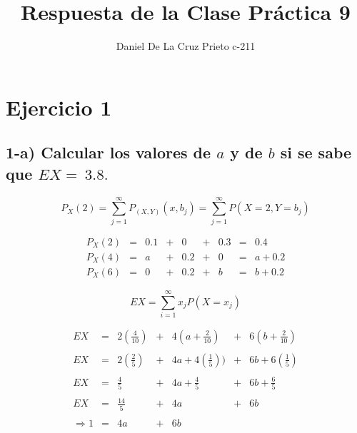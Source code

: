 \documentclass[12pt]{article}
\begin{document}
\title{Respuesta de la Clase Pr\'actica 9}
\author{Daniel De La Cruz Prieto c-211}

\maketitle


\section*{Ejercicio 1}

\subsection*{1-a) Calcular los valores de $a$ y de $b$ si se sabe que $EX =~ 3.8.$}

\begin{equation*}
    P_X\left(2\right) = \sum_{j=1}^{\infty}	P_{\left(X,Y\right)} \left(x,b_j\right) = \sum_{j=1}^{\infty} P\left(X=2,Y=b_j\right)
\end{equation*}

\begin{equation*}
    \begin{array}{rcccccccl}
        P_X\left(2\right) & = & 0.1 & + & 0   & + & 0.3 & = & 0.4
        \\
        P_X\left(4\right) & = & a   & + & 0.2 & + & 0   & = & a + 0.2
        \\
        P_X\left(6\right) & = & 0   & + & 0.2 & + & b   & = & b + 0.2
    \end{array}
\end{equation*}

\begin{equation*}
    EX = \sum_{i=1}^{\infty} x_j P\left(X=x_j\right)
\end{equation*}

\begin{equation*}
    \begin{array}{rcccccl}
        EX            & = & 2(\frac{4}{10})          & + & 4(a+\frac{2}{10})             & + & 6(b+\frac{2}{10})
        \\
        \\
        EX            & = & 2 \left(\frac{2}{5}\right)  & + & 4a + 4 \left(\frac{1}{5}\right))  & + & 6b + 6 \left(\frac{1}{5}\right) 
        \\
        \\
        EX            & = & \frac{4}{5}     & + & 4a + \frac{4}{5}     & + & 6b + \frac{6}{5}
        \\
        \\
        EX            & = & \frac{14}{5}    & + & 4a                   & + & 6b
        \\
        \\
        \Rightarrow 1 & = & 4a              & + & 6b
    \end{array}
\end{equation*}
\end{document}

